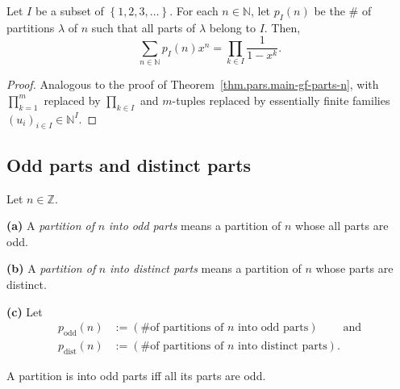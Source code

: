 \begin{theorem}
\label{thm.pars.main-gf-parts-I}
\leantarget
\leanok
Let $I$ be a subset of $\left\{
1,2,3,\ldots\right\}  $. For each $n\in\mathbb{N}$, let $p_{I}\left(
n\right)  $ be the \# of partitions $\lambda$ of $n$ such that all parts of
$\lambda$ belong to $I$. Then,
\[
\sum_{n\in\mathbb{N}}p_{I}\left(  n\right)  x^{n}=\prod_{k\in I}\dfrac
{1}{1-x^{k}}.
\]
\end{theorem}

\begin{proof}
Analogous to the proof of Theorem~\ref{thm.pars.main-gf-parts-n}, with
$\prod_{k=1}^{m}$ replaced by $\prod_{k\in I}$ and
$m$-tuples replaced by essentially finite families $(u_i)_{i\in I}\in\mathbb{N}^{I}$.
\end{proof}

\subsection{Odd parts and distinct parts}

\begin{definition}
\label{def.pars.odd-dist-parts}
\leantarget
\leanok
Let $n\in\mathbb{Z}$. \medskip

\textbf{(a)} A \emph{partition of }$n$\emph{ into odd parts} means a partition
of $n$ whose all parts are odd. \medskip

\textbf{(b)} A \emph{partition of }$n$\emph{ into distinct parts} means a
partition of $n$ whose parts are distinct. \medskip

\textbf{(c)} Let%
\begin{align*}
p_{\operatorname{odd}}\left(  n\right)   &  :=\left(  \text{\# of partitions
of }n\text{ into odd parts}\right)  \ \ \ \ \ \ \ \ \ \ \text{and}\\
p_{\operatorname{dist}}\left(  n\right)   &  :=\left(  \text{\# of partitions
of }n\text{ into distinct parts}\right)  .
\end{align*}
\end{definition}

\begin{lemma}
\label{lem.pars.isOddParts-iff}
\leanhelper
\leanok
A partition is into odd parts iff all its parts are odd.
\end{lemma}

